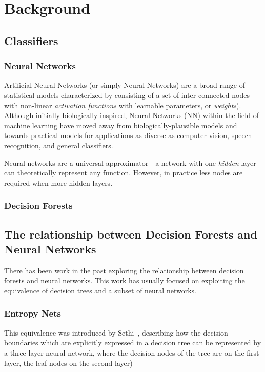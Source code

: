
\chapter{Background}
\label{background}
\ifpdf
    \graphicspath{{Chapter2/Figs/Raster/}{Chapter2/Figs/PDF/}{Chapter2/Figs/}}
\else
    \graphicspath{{Chapter2/Figs/Vector/}{Chapter2/Figs/}}
\fi

\section{Classifiers}
\subsection{Neural Networks}
Artificial Neural Networks (or simply Neural Networks) are a broad range of statistical models characterized by consisting of a set of inter-connected nodes with non-linear \emph{activation functions} with learnable parameters, or \emph{weights}). Although initially biologically inspired, Neural Networks (NN) within the field of machine learning have moved away from biologically-plausible models and towards practical models for applications as diverse as computer vision, speech recognition, and general classifiers.

Neural networks are a universal approximator - a network with one \emph{hidden} layer can theoretically represent any function. However, in practice less nodes are required when more hidden layers.
\subsection{Decision Forests}

\section{The relationship between Decision Forests and Neural Networks}
There has been work in the past exploring the relationship between decision forests and neural networks. This work has usually focused on exploiting the equivalence of decision trees and a subset of neural networks.

\subsection{Entropy Nets}
This equivalence was introduced by Sethi~\cite{Sethi1990}, describing how the decision boundaries which are explicitly expressed in a decision tree can be represented by a three-layer neural network, where the decision nodes of the tree are on the first layer, the leaf nodes on the second layer)
